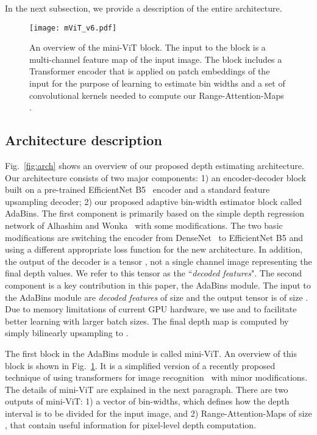 \documentclass[final]{cvpr}
\begin{document}
In the next subsection, we provide a description of the entire architecture.

\begin{figure}[t]
\centering
   \texttt{[image: mViT\_v6.pdf]}
   \caption{An overview of the mini-ViT block. The input to the block is a multi-channel feature map of the input image. The block includes a Transformer encoder that is applied on patch embeddings of the input for the purpose of learning to estimate bin widths  and a set of convolutional kernels needed to compute our Range-Attention-Maps .}
\label{fig:mVit-module}
\end{figure}


\subsection{Architecture description}
Fig.~\ref{fig:arch} shows an overview of our proposed depth estimating architecture. Our architecture consists of two major components: 1) an encoder-decoder block built on a pre-trained EfficientNet B5~\cite{efficentnet_TanL19} encoder and a standard feature upsampling decoder; 2) our proposed adaptive bin-width estimator block called AdaBins.
The first component is primarily based on the simple depth regression network of Alhashim and Wonka~\cite{Alhashim2018} with some modifications. The two basic modifications are switching the encoder from DenseNet~\cite{huang2017densely} to EfficientNet B5 and using a different appropriate loss function for the new architecture. In addition, the output of the decoder is a tensor , not a single channel image representing the final depth values. We refer to this tensor as the ``\textit{decoded features}". 
The second component is a key contribution in this paper, the AdaBins module. The input to the AdaBins module are \textit{decoded features} of size  and the output tensor is of size .
Due to memory limitations of current GPU hardware, we use  and  to facilitate better learning with larger batch sizes. The final depth map is computed by simply bilinearly upsampling to . 

The first block in the AdaBins module is called mini-ViT. An overview of this block is shown in Fig.~\ref{fig:mVit-module}. It is a simplified version of a recently proposed technique of using transformers for image recognition~\cite{dosovitskiy2020} with minor modifications. The details of mini-ViT are explained in the next paragraph. There are two outputs of mini-ViT: 1) a vector  of bin-widths, which defines how the depth interval  is to be divided for the input image, and 2) Range-Attention-Maps  of size , that contain useful information for pixel-level depth computation.
\end{document}
